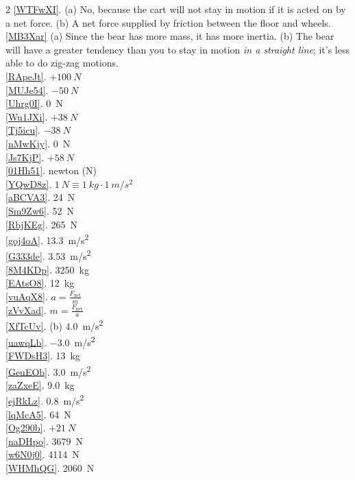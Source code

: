 \documentclass{article}
\numberwithin{equation}{section}
\numberwithin{figure}{section}
\begin{document}
\begin{multicols}{2}
\ref{WTFwXI}. (a) No, because the cart will not stay in motion if it is acted on by a net force. (b) A net force supplied by friction between the floor and wheels.\\
\ref{MB3Xar} (a) Since the bear has more mass, it has more inertia. (b) The bear will have a greater tendency than you to stay in motion \textit{in a straight line}; it's less able to do zig-zag motions.\\
\ref{RApeJt}. $+\SI{100}{N}$\\
\ref{MUJe54}. $-\SI{50}{N}$\\
\ref{Uhrg0I}. \SI{0}{N}\\
\ref{Wu1JXi}. $+\SI{38}{N}$\\
\ref{Tj5icu}. $-\SI{38}{N}$\\
\ref{nMwKjy}. \SI{0}{N}\\
\ref{Js7KjP}. $+\SI{58}{N}$\\
\ref{01Hh51}. newton (N)\\
\ref{YQwD8z}. $\SI{1}{N} \equiv \SI{1}{kg} \cdot \SI{1}{m/s^2}$\\
\ref{aBCVA3}. \SI{24}{N}\\
\ref{Sm9Zw6}. \SI{52}{N}\\
\ref{RbjKEg}. \SI{265}{N}\\
\ref{goj4oA}. \SI{13.3}{m/s^2}\\
\ref{G333de}. \SI{3.53}{m/s^2}\\
\ref{8M4KDp}. \SI{3250}{kg}\\
\ref{EAtsO8}. \SI{12}{kg}\\
\ref{vuAqX8}. $a = \frac{F_{\text{net}}}{m}$\\
\ref{zVvXad}. $m = \frac{F_{\text{net}}}{a}$\\
\ref{XfTcUv}. (b) \SI{4.0}{m/s^2}\\
\ref{uawqLb}. \SI{-3.0}{m/s^2}\\
\ref{FWDsH3}. \SI{13}{kg}\\
\ref{GeuEOb}. \SI{3.0}{m/s^2}\\
\ref{zaZxeE}. \SI{9.0}{kg}\\
\ref{ejRkLz}. \SI{0.8}{m/s^2}\\
\ref{lqMcA5}. \SI{64}{N}\\
\ref{Og290b}. $+\SI{21}{N}$\\
\ref{naDHpo}. \SI{3679}{N}\\
\ref{w6N0j0}. \SI{4114}{N}\\
\ref{WHMhQG}. \SI{2060}{N}\\

\end{multicols}
\end{document}
